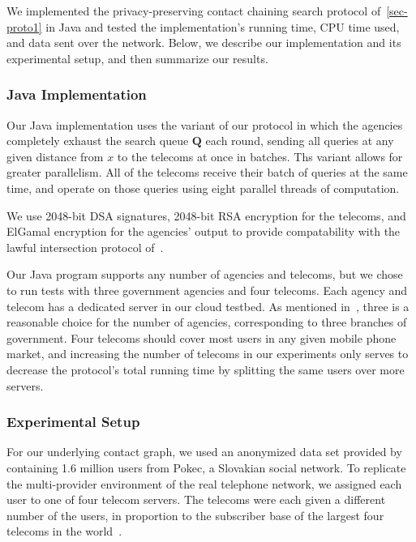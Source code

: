 \label{sec:implementation}

We implemented the privacy-preserving contact chaining search protocol of~\ref{sec-proto1} in Java and tested the implementation's running time, CPU time used, and data sent over the network. Below, we describe our implementation and its experimental setup, and then summarize our results.

\subsubsection{Java Implementation}

Our Java implementation uses the variant of our protocol in which the agencies completely exhaust the search queue $\mathbf{Q}$ each round, sending all queries at any given distance from $x$ to the telecoms at once in batches. Ths variant allows for greater parallelism. All of the telecoms receive their batch of queries at the same time, and operate on those queries using eight parallel threads of computation.



We use 2048-bit DSA signatures, 2048-bit RSA encryption for the telecoms, and ElGamal encryption for the agencies' output to provide compatability with the lawful intersection protocol of~\cite{sff-foci2014}.



Our Java program supports any number of agencies and telecoms, but we chose to run tests with three government agencies and four telecoms. Each agency and telecom has a dedicated server in our cloud testbed. As mentioned in~\cite{sff-foci2014}, three is a reasonable choice for the number of agencies, corresponding to three branches of government. Four telecoms should cover most users in any given mobile phone market, and increasing the number of telecoms in our experiments only serves to decrease the protocol's total running time by splitting the same users over more servers.



\subsubsection{Experimental Setup}

For our underlying contact graph, we used an anonymized data set provided by~\cite{snapnets} containing 1.6 million users from Pokec, a Slovakian social network. To replicate the multi-provider environment of the real telephone network, we assigned each user to one of four telecom servers. The telecoms were each given a different number of the users, in proportion to the subscriber base of the largest four telecoms in the world~\cite{mobiforge}.



